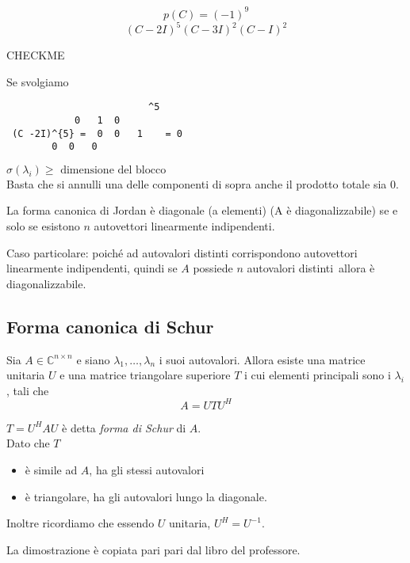 \begin{example}
$$p(C) = (-1)^{9}$$
$$(C -2I)^{5}(C-3I)^{2}(C-I)^{2} $$
\begin{notes}
CHECKME
\end{notes}

Se svolgiamo  
\begin{Verbatim}
                         ^5
	        0   1  0 
 (C -2I)^{5} =  0  0   1    = 0
		0  0   0  
\end{Verbatim}

$\sigma(\lambda_i) \geq \text{ dimensione del blocco }$\\
Basta che si annulli una delle componenti di sopra anche il prodotto 
totale sia 0.
\end{example}

\begin{theo}
La forma canonica di Jordan \`e diagonale (a elementi)  (A \`e diagonalizzabile)
se e solo se
esistono  $n$ autovettori linearmente indipendenti.
\end{theo}
Caso particolare: poich\'e  ad autovalori distinti corrispondono autovettori
linearmente indipendenti, quindi se $A$ possiede $n$ autovalori distinti\
allora \`e diagonalizzabile.

\subsection{Forma canonica di Schur}

\begin{theo}
\label{eigenvalues:schur}
Sia $A \in \mathbb{C}^{n\times n}$ e siano $\lambda_1, \ldots, \lambda_n$
i suoi autovalori. Allora esiste una matrice unitaria $U$ e 
una matrice triangolare superiore $T$ i cui elementi principali sono
i $\lambda_i$, tali che
$$ A = UTU^{H} $$
\end{theo}

$T=U^{H}AU$ \`e detta \emph{forma di Schur} di $A$.\\ 
Dato che $T$ 
\begin{itemize}
\item \`e simile ad $A$, ha gli stessi autovalori 
\item \`e triangolare, ha gli autovalori lungo la diagonale.
\end{itemize}
Inoltre ricordiamo che essendo $U$ unitaria, $U^{H} = U^{-1}$.

\begin{notes}
 La dimostrazione \`e copiata pari pari dal libro del professore.
\end{notes}

